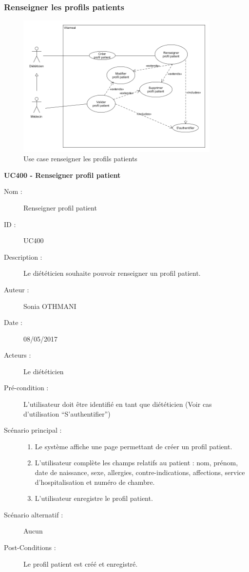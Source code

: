\subsubsection{Renseigner les profils patients}

\begin{figure}[!h]
  \label{diagramme-renseigner-les-profils-patients}
  \centering
  \includegraphics[width=0.9\textwidth]{../../CasDUtilisations/ProfilPatient/ProfilPatient.png}
  \caption{Use case renseigner les profils patients}
\end{figure}

\textbf{UC400 - Renseigner profil patient}
\begin{description}
\item [Nom :] Renseigner profil patient
\item [ID :] UC400
\item [Description :] Le diététicien souhaite pouvoir renseigner un profil patient.
\item [Auteur :] Sonia OTHMANI
\item [Date :] 08/05/2017
\item [Acteurs :] Le diététicien
\item [Pré-condition :] L’utilisateur doit être identifié en tant que diététicien (Voir cas d’utilisation \enquote{S’authentifier})
\item [Scénario principal :]
  \begin{enumerate}
  \item Le système affiche une page permettant de créer un profil patient.
  \item L’utilisateur complète les champs relatifs au patient : nom, prénom, date de naissance, sexe, allergies, contre-indications, affections, service d'hospitalisation et numéro de chambre.
  \item L’utilisateur enregistre le profil patient.
 
  \end{enumerate}
\item [Scénario alternatif :] Aucun
\item [Post-Conditions :] Le profil patient est créé et enregistré.
\end{description}

